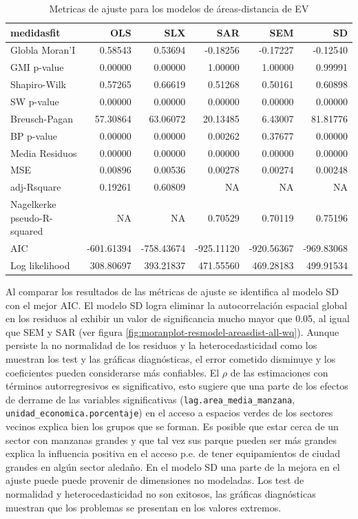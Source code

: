 \documentclass[12pt,]{book}
\begin{document}
\begin{table}

\caption{\label{tab:tabla-comp-modelos-areasdist}Metricas de ajuste para los modelos de áreas-distancia de EV}
\centering
\begin{tabular}[t]{l|r|r|r|r|r}
\hline
medidasfit & OLS & SLX & SAR & SEM & SD\\
\hline
Globla Moran'I & 0.58543 & 0.53694 & -0.18256 & -0.17227 & -0.12540\\
\hline
GMI p-value & 0.00000 & 0.00000 & 1.00000 & 1.00000 & 0.99991\\
\hline
Shapiro-Wilk & 0.57265 & 0.66619 & 0.51268 & 0.50161 & 0.60898\\
\hline
SW p-value & 0.00000 & 0.00000 & 0.00000 & 0.00000 & 0.00000\\
\hline
Breusch-Pagan & 57.30864 & 63.06072 & 20.13485 & 6.43007 & 81.81776\\
\hline
BP p-value & 0.00000 & 0.00000 & 0.00262 & 0.37677 & 0.00000\\
\hline
Media Residuos & 0.00000 & 0.00000 & 0.00000 & 0.00000 & 0.00000\\
\hline
MSE & 0.00896 & 0.00536 & 0.00278 & 0.00274 & 0.00248\\
\hline
adj-Rsquare & 0.19261 & 0.60809 & NA & NA & NA\\
\hline
Nagelkerke pseudo-R-squared & NA & NA & 0.70529 & 0.70119 & 0.75196\\
\hline
AIC & -601.61394 & -758.43674 & -925.11120 & -920.56367 & -969.83068\\
\hline
Log likelihood & 308.80697 & 393.21837 & 471.55560 & 469.28183 & 499.91534\\
\hline
\end{tabular}
\end{table}

Al comparar los resultados de las métricas de ajuste se identifica al
modelo SD con el mejor AIC. El modelo SD logra eliminar la
autocorrelación espacial global en los residuos al exhibir un valor de
significancia mucho mayor que 0.05, al igual que SEM y SAR (ver figura
\ref{fig:moranplot-resmodel-areasdist-all-wq}). Aunque persiste la no
normalidad de los residuos y la heterocedasticidad como los muestran los
test y las gráficas diagnósticas, el error cometido disminuye y los
coeficientes pueden considerarse más confiables. El \(\rho\) de las
estimaciones con términos autorregresivos es significativo, esto sugiere
que una parte de los efectos de derrame de las variables significativas
(\texttt{lag.area\_media\_manzana},
\texttt{unidad\_economica.porcentaje}) en el acceso a espacios verdes de
los sectores vecinos explica bien los grupos que se forman. Es posible
que estar cerca de un sector con manzanas grandes y que tal vez sus
parque pueden ser más grandes explica la influencia positiva en el
acceso p.e. de tener equipamientos de ciudad grandes en algún sector
aledaño. En el modelo SD una parte de la mejora en el ajuste puede puede
provenir de dimensiones no modeladas. Los test de normalidad y
heterocedasticidad no son exitosos, las gráficas diagnósticas muestran
que los problemas se presentan en los valores extremos.
\end{document}
